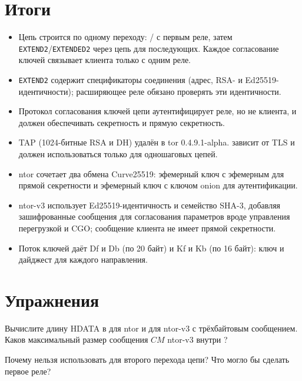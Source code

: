 \section*{Итоги}
\begin{itemize}
  \item Цепь строится по одному переходу: / с первым реле, затем \texttt{EXTEND2}/\texttt{EXTENDED2} через цепь для последующих. Каждое согласование ключей связывает клиента только с одним реле.
  \item \texttt{EXTEND2} содержит спецификаторы соединения (адрес, RSA- и Ed25519-идентичности); расширяющее реле обязано проверять эти идентичности.
  \item Протокол согласования ключей цепи аутентифицирует реле, но не клиента, и должен обеспечивать секретность и прямую секретность.
  \item TAP (1024-битные RSA и DH) удалён в tor 0.4.9.1-alpha.  зависит от TLS и должен использоваться только для одношаговых цепей.
  \item ntor сочетает два обмена Curve25519: эфемерный ключ с эфемерным для прямой секретности и эфемерный ключ с ключом onion для аутентификации.
  \item ntor-v3 использует Ed25519-идентичность и семейство SHA-3, добавляя зашифрованные сообщения для согласования параметров вроде управления перегрузкой и CGO; сообщение клиента не имеет прямой секретности.
  \item Поток ключей даёт Df и Db (по 20 байт) и Kf и Kb (по 16 байт): ключ и дайджест для каждого направления.
\end{itemize}

\section*{Упражнения}

\begin{esercizio}[1]\label{es:09-dimensioni}
Вычислите длину HDATA в  для ntor и для ntor-v3 с трёхбайтовым сообщением. Каков максимальный размер сообщения $CM$ ntor-v3 внутри ?
\end{esercizio}

\begin{esercizio}[1]\label{es:09-fast}
Почему  нельзя использовать для второго перехода цепи? Что могло бы сделать первое реле?
\end{esercizio}

